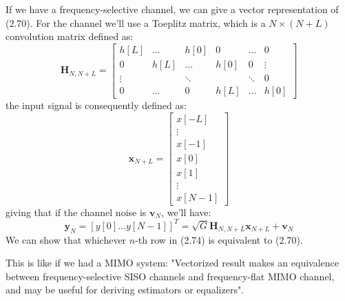 \documentclass[a4paper, 12pt]{book}
\begin{document}
If we have a frequency-selective channel, we can give a vector representation of (2.70).
For the channel we'll use a Toeplitz matrix, which is a $N \times (N+L)$ convolution matrix defined as:
\begin{equation}
\boldsymbol{H}_{N, N+L} = 
\begin{bmatrix}
h[L] & \dots & h[0] & 0 & \dots & 0 \\
0 & h[L] & \dots & h[0] & 0 & \vdots \\
\vdots & & \ddots & & \ddots & 0 \\
0 & \dots & 0 & h[L] & \dots & h[0]
\end{bmatrix} \tag{2.72}
\end{equation}
the input signal is consequently defined as:
\begin{equation}
\boldsymbol{x}_{N+L} = 
\begin{bmatrix}
x[-L] \\
\vdots \\
x[-1] \\
x[0] \\
x[1] \\
\vdots \\
x[N-1]
\end{bmatrix} \tag{2.73}
\end{equation}
giving that if the channel noise is $\boldsymbol{v}_N$, we'll have:
\begin{equation}
\boldsymbol{y}_N = [y[0] \dots y[N-1]]^T = \sqrt{G} \boldsymbol{H}_{N, N+L} \boldsymbol{x}_{N+L} + \boldsymbol{v}_N \tag{2.74}
\end{equation}
We can show that whichever $n$-th row in (2.74) is equivalent to (2.70).

This is like if we had a MIMO system: "Vectorized result makes an equivalence between frequency-selective SISO channels and frequency-flat MIMO channel, and may be useful for deriving estimators or equalizers".
\end{document}
